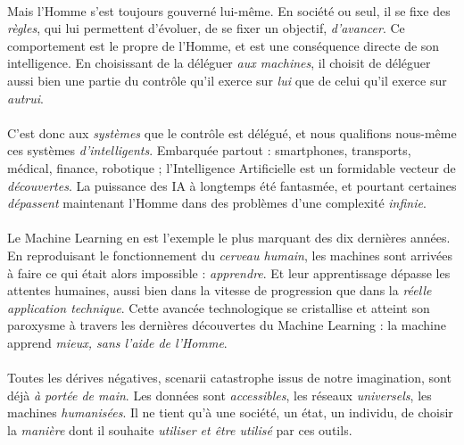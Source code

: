 \paragraph{} Mais l'Homme s'est toujours gouverné lui-même. En société ou seul, il se fixe
des \emph{règles}, qui lui permettent d'évoluer, de se fixer un objectif, \emph{d'avancer}.
Ce comportement est le propre de l'Homme, et est une conséquence directe de son intelligence.
En choisissant de la déléguer \emph{aux machines}, il choisit de déléguer aussi
bien une partie du contrôle qu'il exerce sur \emph{lui} que de celui qu'il exerce sur \emph{autrui}.

\paragraph{} C'est donc aux \emph{systèmes} que le contrôle est délégué, et nous qualifions
nous-même ces systèmes \emph{d'intelligents}. Embarquée partout : smartphones, transports,
médical, finance, robotique ; l'Intelligence Artificielle est un formidable vecteur
de \emph{découvertes}. La puissance des IA à longtemps été fantasmée, et pourtant 
certaines \emph{dépassent} maintenant l'Homme dans des problèmes d'une complexité \emph{infinie}. 

\paragraph{} Le Machine Learning en est l'exemple le plus marquant des dix dernières
années. En reproduisant le fonctionnement du \emph{cerveau humain}, les machines sont
arrivées à faire ce qui était alors impossible : \emph{apprendre}. Et leur apprentissage
dépasse les attentes humaines, aussi bien dans la vitesse de progression que dans la
\emph{réelle application technique}. Cette avancée technologique se cristallise et 
atteint son paroxysme à travers les dernières découvertes du Machine Learning : la
machine apprend \emph{mieux, sans l'aide de l'Homme}. 

\paragraph{} Toutes les dérives négatives, scenarii catastrophe issus de notre imagination,
sont déjà \emph{à portée de main}. Les données sont \emph{accessibles}, les réseaux \emph{universels},
les machines \emph{humanisées}. Il ne tient qu'à une société, un état, un
individu, de choisir la \emph{manière} dont il souhaite \emph{utiliser et être
utilisé} par ces outils.

